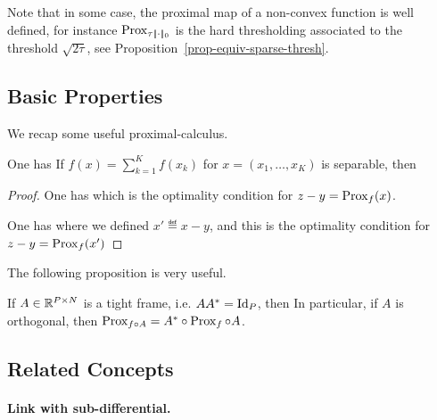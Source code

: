Note that in some case, the proximal map of a non-convex function is well defined, for instance
$\operatorname{Prox}_{\tau |\!| \cdot |\!|_0}$ is the hard thresholding associated to the threshold $\sqrt{2\tau}$, see Proposition~\ref{prop-equiv-sparse-thresh}.


\subsection{Basic Properties}

We recap some useful proximal-calculus.

\begin{prop}
One has
If $f(x)=\sum_{k=1}^K f(x_k)$ for $x=(x_1,\ldots,x_K)$ is separable, then
\end{prop}
\begin{proof}
	One has
	which is the optimality condition for $z-y = \operatorname{Prox}_{f}(x)$.
	
	
	One has
	where we defined $x' \eqdef x-y$, and this is the optimality condition for $z-y = \operatorname{Prox}_{f}(x')$
\end{proof}

The following proposition is very useful.

\begin{prop}\label{prop-prox-tightframe}
	If $A \in \mathbb{R}^{P \times N}$ is a tight frame, i.e. $AA^*=\mathrm{Id}_P$, then 
	In particular, if $A$ is orthogonal, then $\operatorname{Prox}_{f \circ A} = A^* \circ \operatorname{Prox}_{f} \circ A$.
\end{prop}


\subsection{Related Concepts}

\paragraph{Link with sub-differential.}

